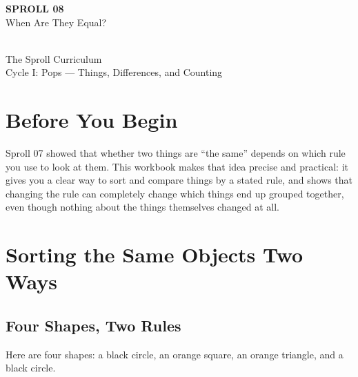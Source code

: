 \documentclass[11pt]{book}
\begin{document}
\begin{titlepage}
\centering
\vspace*{1.4in}
{\Huge \textbf{SPROLL 08}}\\[0.5in]
{\huge When Are They Equal?}\\[0.8in]
\\[0.8in]
{\Large The Sproll Curriculum}\\[0.2in]
{\large Cycle I: Pops --- Things, Differences, and Counting}
\end{titlepage}

\tableofcontents

\chapter*{Before You Begin}

Sproll 07 showed that whether two things are ``the same'' depends on which rule you use to look at them. This workbook makes that idea precise and practical: it gives you a clear way to sort and compare things by a stated rule, and shows that changing the rule can completely change which things end up grouped together, even though nothing about the things themselves changed at all.

\chapter{Sorting the Same Objects Two Ways}

\section{Four Shapes, Two Rules}

Here are four shapes: a black circle, an orange square, an orange triangle, and a black circle.

\begin{center}
\end{center}
\end{document}
